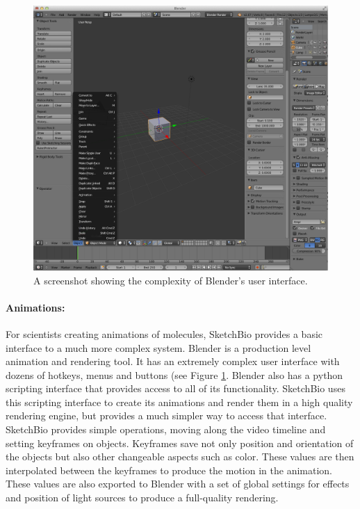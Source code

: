 \documentclass[twocolumn]{bmcart}%
\begin{document}
\begin{figure}[h]
\centering
\includegraphics[width=0.9\columnwidth]{blender_interface.png}
\caption{A screenshot showing the complexity of Blender's user interface.}
\label{fig:blender_interface}
\end{figure}

\paragraph*{Animations:}
For scientists creating animations of molecules, SketchBio provides a basic interface to a much more complex system.  Blender is a production level animation and rendering tool.  It has an extremely complex user interface with dozens of hotkeys, menus and buttons (see Figure \ref{fig:blender_interface}.  Blender also has a python scripting interface that provides access to all of its functionality.  SketchBio uses this scripting interface to create its animations and render them in a high quality rendering engine, but provides a much simpler way to access that interface.  SketchBio provides simple operations, moving along the video timeline and setting keyframes on objects.  Keyframes save not only position and orientation of the objects but also other changeable aspects such as color.  These values are then interpolated between the keyframes to produce the motion in the animation.  These values are also exported to Blender with a set of global settings for effects and position of light sources to produce a full-quality rendering.
\end{document}
